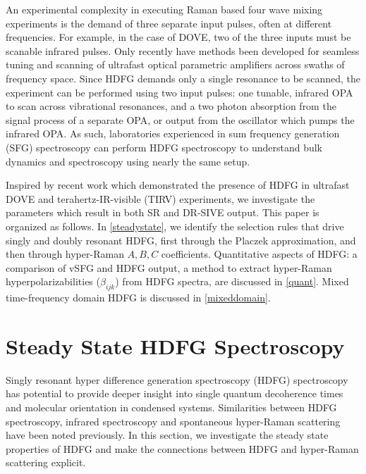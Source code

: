 \documentclass[aip, jcp, reprint, onecolumn]{revtex4-2}
\begin{document}
An experimental complexity in executing Raman based four wave mixing experiments is the demand of three separate input pulses, often at different frequencies.
For example, in the case of DOVE, two of the three inputs must be scanable infrared pulses. \cite{RN345} 
Only recently have methods been developed for seamless tuning and scanning of ultrafast optical parametric amplifiers across swaths of frequency space. \cite{RN162, McDonnell2024, SkyeOPA, KyleOPA}
Since HDFG demands only a single resonance to be scanned, the experiment can be performed using two input pulses: one tunable, infrared OPA to scan across vibrational resonances, and a two photon absorption from the signal process of a separate OPA, or output from the oscillator which pumps the infrared OPA. \cite{Wang2021}
As such, laboratories experienced in sum frequency generation (SFG) spectroscopy can perform HDFG spectroscopy to understand bulk dynamics and spectroscopy using nearly the same setup.\cite{Shen1987_CPL}

Inspired by recent work which demonstrated the presence of HDFG in ultrafast DOVE and terahertz-IR-visible (TIRV) experiments, we investigate the parameters which result in both SR and DR-SIVE output. \cite{Cho2000, Bonn2024, McDonnell2024}
This paper is organized as follows.
In \autoref{steadystate}, we identify the selection rules that drive singly and doubly resonant HDFG, first through the Placzek approximation, and then through hyper-Raman $A,B,C$ coefficients.
Quantitative aspects of HDFG: a comparison of vSFG and HDFG output, a method to extract hyper-Raman hyperpolarizabilities ($\beta_{ijk}$) from HDFG spectra, are discussed in \autoref{quant}.
Mixed time-frequency domain HDFG is discussed in \autoref{mixeddomain}. 

\section{Steady State HDFG Spectroscopy}\label{steadystate}

Singly resonant hyper difference generation spectroscopy (HDFG) spectroscopy has potential to provide deeper insight into single quantum decoherence times and molecular orientation in condensed systems.
Similarities between HDFG spectroscopy, infrared spectroscopy and spontaneous hyper-Raman scattering have been noted previously. \cite{RN352, Bonn2024, McDonnell2024}
In this section, we investigate the steady state properties of HDFG and make the connections between HDFG and hyper-Raman scattering explicit.
\end{document}
